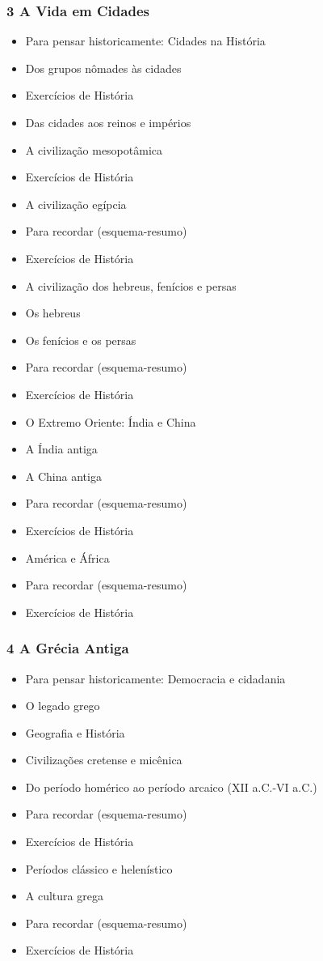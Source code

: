 \documentclass[a4paper,12pt]{article}[abntex2]
\begin{document}
\subsubsection*{3 A Vida em Cidades}

\begin{itemize}
\item Para pensar historicamente: Cidades na História
\item Dos grupos nômades às cidades
\item Exercícios de História
\item Das cidades aos reinos e impérios
\item A civilização mesopotâmica
\item Exercícios de História
\item A civilização egípcia
\item Para recordar (esquema-resumo)
\item Exercícios de História
\item A civilização dos hebreus, fenícios e persas
\item Os hebreus
\item Os fenícios e os persas
\item Para recordar (esquema-resumo)
\item Exercícios de História
\item O Extremo Oriente: Índia e China
\item A Índia antiga
\item A China antiga
\item Para recordar (esquema-resumo)
\item Exercícios de História
\item América e África
\item Para recordar (esquema-resumo)
\item Exercícios de História
\end{itemize}
\subsubsection*{4 A Grécia Antiga}

\begin{itemize}
\item Para pensar historicamente: Democracia e cidadania
\item O legado grego
\item Geografia e História
\item Civilizações cretense e micênica
\item Do período homérico ao período arcaico (XII a.C.-VI a.C.)
\item Para recordar (esquema-resumo)
\item Exercícios de História
\item Períodos clássico e helenístico
\item A cultura grega
\item Para recordar (esquema-resumo)
\item Exercícios de História
\end{itemize}
\end{document}
